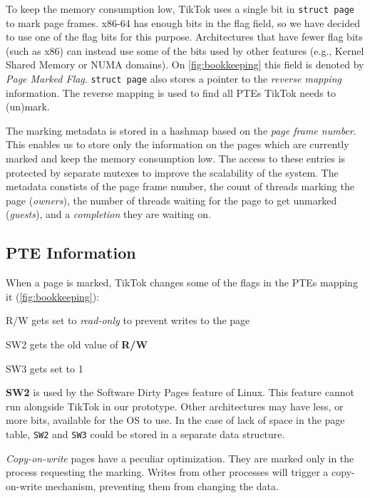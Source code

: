 \documentclass[conference]{IEEEtran}
\newcommand{\sysname}{TikTok}
\begin{document}
To keep the memory consumption low, \sysname{} uses a single bit in \texttt{struct
page} to mark page frames. x86-64 has enough bits in the flag
field, so we have decided to use one of the flag bits for this purpose.
Architectures that have fewer flag bits (such as x86) can instead use some of
the bits used by other features (e.g., Kernel Shared Memory or NUMA domains). On
\autoref{fig:bookkeeping} this field is denoted by \emph{Page Marked Flag}.
\texttt{struct page} also stores a pointer to the \emph{reverse mapping}
information. The reverse mapping is used to find all PTEs \sysname{} needs to
(un)mark.

The marking metadata is stored in a hashmap based on the \emph{page frame
number}. This enables us to store only the information on the pages which are
currently marked and keep the memory consumption low. The access to these entries
is protected by separate mutexes to improve the scalability of the system. The
metadata constists of the page frame number, the count of threads marking the page
(\emph{owners}), the number of threads waiting for the page to get unmarked
(\emph{guests}), and a \emph{completion} they are waiting on. 

\subsection{PTE Information}
\label{subsec:pageinfo}

When a page is marked, \sysname{} changes some of the flags in the PTEs mapping it
(\autoref{fig:bookkeeping}):

\begin{LaTeXdescription}
  \item[R/W] gets set to \emph{read-only} to prevent writes to the page
  \item[SW2] gets the old value of \textbf{R/W}
  \item[SW3] gets set to 1 
\end{LaTeXdescription}

\textbf{SW2} is used by the Software Dirty Pages
feature of Linux. This feature cannot run alongside \sysname{} in our prototype.
Other architectures may have less, or more bits, available for the OS to use. In
the case of lack of space in the page table, \texttt{SW2} and \texttt{SW3} could
be stored in a separate data structure.

\emph{Copy-on-write} pages have a peculiar optimization. They are marked only in
the process requesting the marking. Writes from other processes will trigger a
copy-on-write mechanism, preventing them from changing the data.
\end{document}
